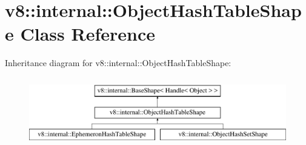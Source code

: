 \hypertarget{classv8_1_1internal_1_1ObjectHashTableShape}{}\section{v8\+:\+:internal\+:\+:Object\+Hash\+Table\+Shape Class Reference}
\label{classv8_1_1internal_1_1ObjectHashTableShape}
Inheritance diagram for v8\+:\+:internal\+:\+:Object\+Hash\+Table\+Shape\+:\begin{figure}[H]
\begin{center}
\leavevmode
\includegraphics[height=3.000000cm]{classv8_1_1internal_1_1ObjectHashTableShape}
\end{center}
\end{figure}
